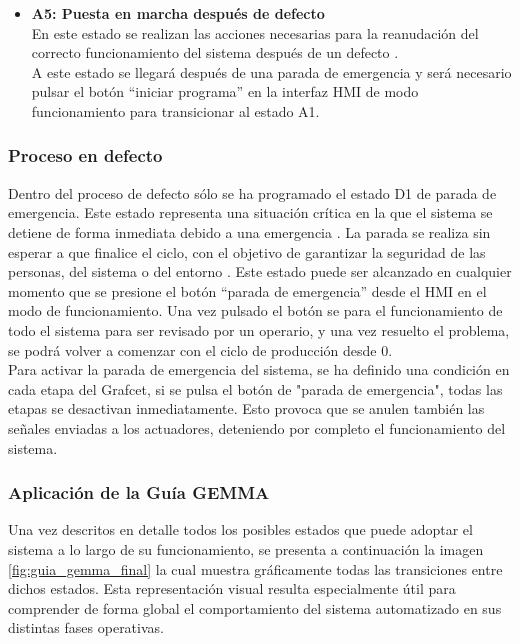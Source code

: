 \begin{itemize}
   \item \textbf{A5: Puesta en marcha después de defecto} \\
   En este estado se realizan las acciones necesarias para la reanudación del correcto funcionamiento del sistema después de un defecto \cite{guia_gemma}. \\
   A este estado se llegará después de una parada de emergencia y será necesario pulsar el botón ``iniciar programa'' en la interfaz HMI de modo funcionamiento para transicionar al estado A1.
\end{itemize}

\subsubsection{Proceso en defecto}

Dentro del proceso de defecto sólo se ha programado el estado D1 de parada de emergencia. Este estado representa una situación crítica en la que el sistema se detiene de forma inmediata debido a una emergencia \cite{guia_gemma}. La parada se realiza sin esperar a que finalice el ciclo, con el objetivo de garantizar la seguridad de las personas, del sistema o del entorno \cite{guia_gemma}. Este estado puede ser alcanzado en cualquier momento que se presione el botón ``parada de emergencia'' desde el HMI en el modo de funcionamiento. Una vez pulsado el botón se para el funcionamiento de todo el sistema para ser revisado por un operario, y una vez resuelto el problema, se podrá volver a comenzar con el ciclo de producción desde 0. \\

Para activar la parada de emergencia del sistema, se ha definido una condición en cada etapa del Grafcet, si se pulsa el botón de "parada de emergencia", todas las etapas se desactivan inmediatamente. Esto provoca que se anulen también las señales enviadas a los actuadores, deteniendo por completo el funcionamiento del sistema.

\clearpage

\subsubsection{Aplicación de la Guía GEMMA}

Una vez descritos en detalle todos los posibles estados que puede adoptar el sistema a lo largo de su funcionamiento, se presenta a continuación la imagen \ref{fig:guia_gemma_final} la cual muestra gráficamente todas las transiciones entre dichos estados. Esta representación visual resulta especialmente útil para comprender de forma global el comportamiento del sistema automatizado en sus distintas fases operativas. 

